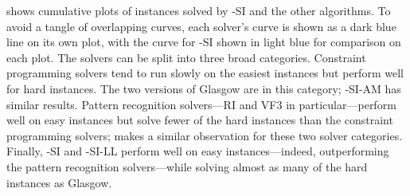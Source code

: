  shows cumulative plots of instances solved by \McSplit-SI
and the other algorithms.  To avoid a tangle of overlapping curves, each solver's curve is shown as a dark
blue line on its own plot, with the curve for \McSplit-SI shown in light blue for comparison on each
plot.  The solvers can be split into three broad categories.  Constraint programming solvers tend
to run slowly on the easiest instances but perform well for hard instances.  The two versions of Glasgow
are in this category; \McSplit-SI-AM has similar results.  Pattern recognition solvers---RI and VF3
in particular---perform well on easy instances but solve fewer of the hard instances than the constraint
programming solvers;
\citet{DBLP:conf/gbrpr/Solnon19} makes a similar observation for these two solver categories.
Finally, \McSplit-SI and \McSplit-SI-LL perform well on easy instances---indeed, outperforming
the pattern recognition solvers---while solving almost as many of the hard instances as Glasgow.

